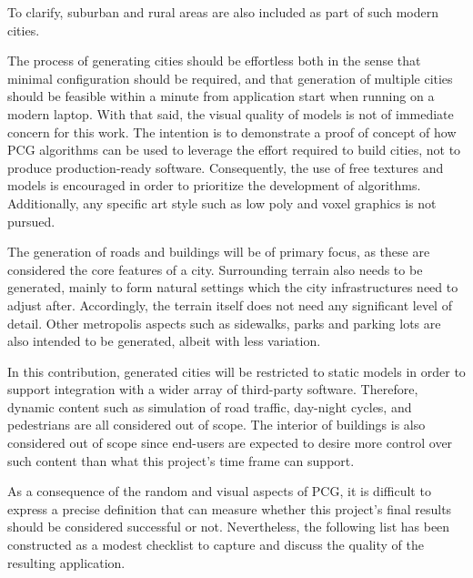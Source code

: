 To clarify, suburban and rural areas are also included as part of such modern cities.

The process of generating cities should be effortless both in the sense that minimal configuration should be required, and that generation of multiple cities should be feasible within a minute from application start when running on a modern laptop.
With that said, the visual quality of models is not of immediate concern for this work.
The intention is to demonstrate a proof of concept of how PCG algorithms can be used to leverage the effort required to build cities, not to produce production-ready software.
Consequently, the use of free textures and models is encouraged in order to prioritize the development of algorithms.
Additionally, any specific art style such as low poly \cite{lowpoly_wiki} and voxel graphics \cite{voxels_wiki} is not pursued.

The generation of roads and buildings will be of primary focus, as these are considered the core features of a city.
Surrounding terrain also needs to be generated, mainly to form natural settings which the city infrastructures need to adjust after.
Accordingly, the terrain itself does not need any significant level of detail.
Other metropolis aspects such as sidewalks, parks and parking lots are also intended to be generated, albeit with less variation.

In this contribution, generated cities will be restricted to static models in order to support integration with a wider array of third-party software.
Therefore, dynamic content such as simulation of road traffic, day-night cycles, and pedestrians are all considered out of scope.
The interior of buildings is also considered out of scope since end-users are expected to desire more control over such content than what this project's time frame can support.

As a consequence of the random and visual aspects of PCG, it is difficult to express a precise definition that can measure whether this project's final results should be considered successful or not.
Nevertheless, the following list has been constructed as a modest checklist to capture and discuss the quality of the resulting application.

